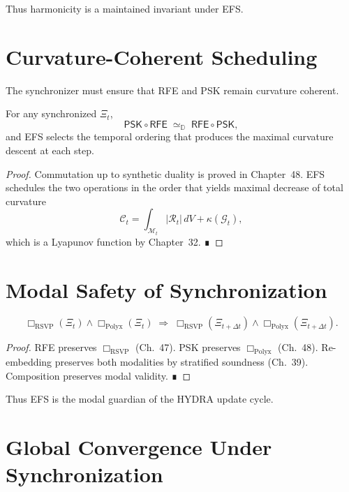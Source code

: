 Thus harmonicity is a maintained invariant under EFS.

\section{Curvature-Coherent Scheduling}

The synchronizer must ensure that RFE and PSK remain curvature coherent.

\begin{theorem}
\label{thm:curvature-schedule}
For any synchronized $\Xi_t$,
\[
\mathsf{PSK}\circ\mathsf{RFE}
\;\simeq_{\mathbb{D}}\;
\mathsf{RFE}\circ\mathsf{PSK},
\]
and EFS selects the temporal ordering that produces the maximal curvature
descent at each step.
\end{theorem}

\begin{proof}
Commutation up to synthetic duality is proved in Chapter~48.
EFS schedules the two operations in the order that yields maximal decrease of
total curvature
\[
\mathcal{C}_t = \int_{\mathcal{M}_t} |\mathcal{R}_t|\, dV + \kappa(\mathcal{G}_t),
\]
which is a Lyapunov function by Chapter~32. ∎
\end{proof}

\section{Modal Safety of Synchronization}

\begin{theorem}
\[
\Box_{\mathrm{RSVP}}(\Xi_t) \wedge \Box_{\mathrm{Polyx}}(\Xi_t)
\;\Longrightarrow\;
\Box_{\mathrm{RSVP}}(\Xi_{t+\Delta t})
\wedge
\Box_{\mathrm{Polyx}}(\Xi_{t+\Delta t}).
\]
\end{theorem}

\begin{proof}
RFE preserves $\Box_{\mathrm{RSVP}}$ (Ch.~47).
PSK preserves $\Box_{\mathrm{Polyx}}$ (Ch.~48).
Re-embedding preserves both modalities by stratified soundness (Ch.~39).
Composition preserves modal validity. ∎
\end{proof}

Thus EFS is the modal guardian of the HYDRA update cycle.

\section{Global Convergence Under Synchronization}

